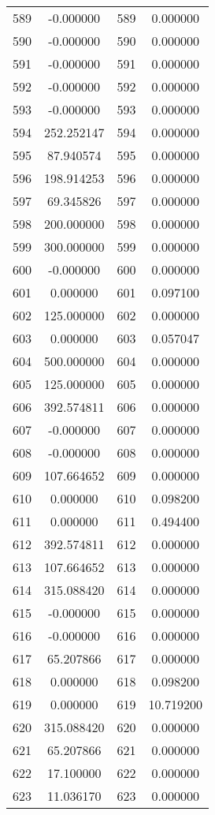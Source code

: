 \documentclass[12pt]{article}
\begin{document}
\begin{longtable}{@{}cccc@{}}
589 & -0.000000 & 589 & 0.000000 \\
590 & -0.000000 & 590 & 0.000000 \\
591 & -0.000000 & 591 & 0.000000 \\
592 & -0.000000 & 592 & 0.000000 \\
593 & -0.000000 & 593 & 0.000000 \\
594 & 252.252147 & 594 & 0.000000 \\
595 & 87.940574 & 595 & 0.000000 \\
596 & 198.914253 & 596 & 0.000000 \\
597 & 69.345826 & 597 & 0.000000 \\
598 & 200.000000 & 598 & 0.000000 \\
599 & 300.000000 & 599 & 0.000000 \\
600 & -0.000000 & 600 & 0.000000 \\
601 & 0.000000 & 601 & 0.097100 \\
602 & 125.000000 & 602 & 0.000000 \\
603 & 0.000000 & 603 & 0.057047 \\
604 & 500.000000 & 604 & 0.000000 \\
605 & 125.000000 & 605 & 0.000000 \\
606 & 392.574811 & 606 & 0.000000 \\
607 & -0.000000 & 607 & 0.000000 \\
608 & -0.000000 & 608 & 0.000000 \\
609 & 107.664652 & 609 & 0.000000 \\
610 & 0.000000 & 610 & 0.098200 \\
611 & 0.000000 & 611 & 0.494400 \\
612 & 392.574811 & 612 & 0.000000 \\
613 & 107.664652 & 613 & 0.000000 \\
614 & 315.088420 & 614 & 0.000000 \\
615 & -0.000000 & 615 & 0.000000 \\
616 & -0.000000 & 616 & 0.000000 \\
617 & 65.207866 & 617 & 0.000000 \\
618 & 0.000000 & 618 & 0.098200 \\
619 & 0.000000 & 619 & 10.719200 \\
620 & 315.088420 & 620 & 0.000000 \\
621 & 65.207866 & 621 & 0.000000 \\
622 & 17.100000 & 622 & 0.000000 \\
623 & 11.036170 & 623 & 0.000000 \\

\end{longtable}
\end{document}
